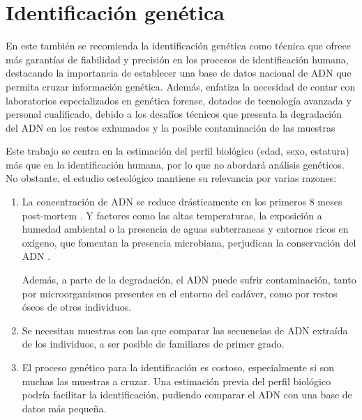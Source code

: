 \chapter{Identificación genética}

En este también se recomienda la identificación genética como técnica que ofrece más garantías de fiabilidad y 
precisión en los procesos de identificación humana, destacando la importancia de establecer una base de datos nacional 
de ADN que permita cruzar información genética. Además, enfatiza la necesidad de contar con laboratorios especializados 
en genética forense, dotados de tecnología avanzada y personal cualificado, debido a los desafíos técnicos que presenta 
la degradación del ADN en los restos exhumados y la posible contaminación de las muestras

Este trabajo se centra en la estimación del perfil biológico (edad, sexo, estatura) más que en la identificación 
humana, por lo que no abordará análisis genéticos. No obstante, el estudio osteológico mantiene su relevancia por 
varias razones:

\begin{enumerate}
    
    \item La concentración de ADN se reduce drásticamente en los primeros 8 meses post-mortem \cite{higgins2015differential}. 
    Y factores como las altas temperaturas, la exposición a humedad ambiental o la presencia de aguas subterraneas y 
    entornos ricos en oxígeno, que fomentan la presencia microbiana, perjudican la conservación del ADN 
    \cite{latham2018dna}. 

    Además, a parte de la degradación, el ADN puede sufrir contaminación, tanto por microorganismos presentes en el entorno 
    del cadáver, como por restos óseos de otros individuos.



    \item Se necesitan muestras con las que comparar las secuencias de ADN extraída de los individuos, a ser posible de
    familiares de primer grado. 


    \item El proceso genético para la identificación es costoso, especialmente si son muchas las muestras a cruzar. 
    Una estimación previa del perfil biológico podría facilitar la identificación, pudiendo comparar el ADN con una base
    de datos más pequeña.

\end{enumerate}
